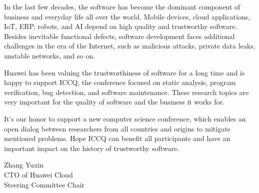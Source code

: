 \clearpage
{}

In the last few decades, the software has become the dominant component of business and everyday life all over the world. Mobile devices, cloud applications, IoT, ERP, robots, and AI depend on high quality and trustworthy software. Besides inevitable functional defects, software development faces additional challenges in the era of the Internet, such as malicious attacks, private data leaks, unstable networks, and so on.

Huawei has been valuing the trustworthiness of software for a long time and is happy to support ICCQ, the conference focused on static analysis, program verification, bug detection, and software maintenance. These research topics are very important for the quality of software and the business it works for.

It's our honor to support a new computer science conference, which enables an open dialog between researchers from all countries and origins to mitigate mentioned problems. Hope ICCQ can benefit all participants and have an important impact on the history of trustworthy software.

Zhang Yuxin \\
CTO of Huawei Cloud \\
Steering Committee Chair
